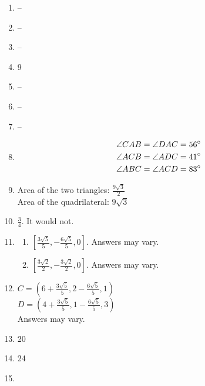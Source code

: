 \documentclass{article}
\begin{document}
\begin{enumerate}
\begin{enumerate}
	\end{enumerate}
	
\item --

\item --

\item --

\item 9

\item --

\item --

\item --

\item
	\begin{gather*}
	\angle CAB = \angle DAC = 56\degree \\
	\angle ACB = \angle ADC = 41\degree \\
	\angle ABC = \angle ACD = 83\degree
	\end{gather*}
	
\item Area of the two triangles: $\frac{9\sqrt{3}}{2}$ \\
	Area of the quadrilateral: $9\sqrt{3}$
	
\item $\frac{3}{4}$. It would not.

\item

	\begin{enumerate}
	
	\item $[\frac{3\sqrt{5}}{5}, -\frac{6\sqrt{5}}{5}, 0]$. Answers may vary.
	
	\item $[\frac{3\sqrt{2}}{2}, -\frac{3\sqrt{2}}{2}, 0]$. Answers may vary.
	
	\end{enumerate}
	
\item $C = (6 + \frac{3\sqrt{5}}{5}, 2 - \frac{6\sqrt{5}}{5}, 1)$ \\
	$D = (4 + \frac{3\sqrt{5}}{5}, 1 - \frac{6\sqrt{5}}{5}, 3)$ \\
	Answers may vary. 
	
\item 20

\item 24

\item


\end{enumerate}
\end{document}
